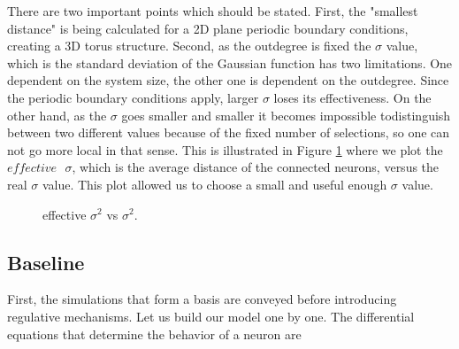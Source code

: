 \documentclass[a4paper,12pt]{article}
\begin{document}
There are two important points which should be stated. First, the "smallest distance" is being calculated for a 2D plane periodic boundary conditions, creating a 3D torus structure. Second, as the outdegree is fixed the $\sigma$ value, which is the standard deviation of the Gaussian function has two limitations. One dependent on the system size, the other one is dependent on the outdegree. Since the periodic boundary conditions apply, larger $\sigma$ loses its effectiveness. On the other hand, as the $\sigma$ goes smaller and smaller it becomes impossible todistinguish between two different values because of the fixed number of selections, so one can not go more local in that sense. This is illustrated in Figure \ref{effectivesigma} where we plot the  $effective \text{ } \sigma$, which is the average distance of the connected neurons, versus the real $\sigma$ value. This plot allowed us to choose a small and useful enough $\sigma$ value. 
\begin{figure}[H] 
    \caption{effective $\sigma ^2$ vs $\sigma ^2$.}
    \label{effectivesigma}
\end{figure}



\subsection{Baseline}


First, the simulations that form a basis are conveyed before introducing regulative mechanisms. Let us build our model one by one. The differential equations that determine the behavior of a neuron are 
\end{document}
